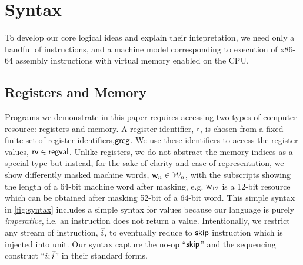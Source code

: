\section{Syntax}
\label{sec:syntax}
To develop our core logical ideas and explain their intepretation, we need only a handful of instructions, and a machine model corresponding to execution of x86-64 assembly instructions with virtual memory enabled on the CPU.

\subsection{Registers and Memory}
Programs we demonstrate in this paper requires accessing two types of computer resource: registers and memory. A register identifier, $\mathsf{r}$, is chosen from a fixed finite set of register identifiers,$\mathsf{greg}$. We use these identifiers to access the register values, $\mathsf{rv} \in \mathsf{regval}$. Unlike registers, we do not abstract the memory indices as a special type but instead, for the sake of clarity and ease of representation, we show differently masked machine words, $\mathsf{w}_n \in \mathcal{W}_n$, with the subscripts showing the length of a 64-bit machine word after masking, e.g. $\mathsf{w}_{12}$ is a 12-bit resource which can be obtained after masking 52-bit of a 64-bit word.
This simple syntax in \ref{fig:syntax} includes a simple syntax for values because our language is purely \textit{imperative}, i.e. an instruction does not return a value. Intentionally, we restrict any stream of instruction, $\vec{i}$, to eventually reduce to $\mathsf{skip}$ instruction which is injected into unit. Our syntax capture the no-op ``$\mathsf{skip}$'' and the sequencing construct ``$i; \vec{i}$'' in their standard forms.

